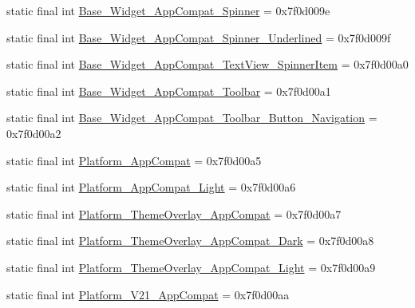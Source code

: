 \begin{DoxyCompactItemize}
\item 
static final int \mbox{\hyperlink{classandroid_1_1support_1_1v7_1_1appcompat_1_1_r_1_1style_a7aebba64b6a5890c12ec4fd4196b36cc}{Base\+\_\+\+Widget\+\_\+\+App\+Compat\+\_\+\+Spinner}} = 0x7f0d009e
\item 
static final int \mbox{\hyperlink{classandroid_1_1support_1_1v7_1_1appcompat_1_1_r_1_1style_a320d36af9a1b161f8d8bceb2add804af}{Base\+\_\+\+Widget\+\_\+\+App\+Compat\+\_\+\+Spinner\+\_\+\+Underlined}} = 0x7f0d009f
\item 
static final int \mbox{\hyperlink{classandroid_1_1support_1_1v7_1_1appcompat_1_1_r_1_1style_a2b2ea8aed9a7cfd0340087f3b14f273f}{Base\+\_\+\+Widget\+\_\+\+App\+Compat\+\_\+\+Text\+View\+\_\+\+Spinner\+Item}} = 0x7f0d00a0
\item 
static final int \mbox{\hyperlink{classandroid_1_1support_1_1v7_1_1appcompat_1_1_r_1_1style_ab2a5b30c6563b433f6b30f720c9febdb}{Base\+\_\+\+Widget\+\_\+\+App\+Compat\+\_\+\+Toolbar}} = 0x7f0d00a1
\item 
static final int \mbox{\hyperlink{classandroid_1_1support_1_1v7_1_1appcompat_1_1_r_1_1style_ad89e1f45e5f45327367aaeb165887dda}{Base\+\_\+\+Widget\+\_\+\+App\+Compat\+\_\+\+Toolbar\+\_\+\+Button\+\_\+\+Navigation}} = 0x7f0d00a2
\item 
static final int \mbox{\hyperlink{classandroid_1_1support_1_1v7_1_1appcompat_1_1_r_1_1style_a384c9f78df3b7c85d4456ea70e0f1a6b}{Platform\+\_\+\+App\+Compat}} = 0x7f0d00a5
\item 
static final int \mbox{\hyperlink{classandroid_1_1support_1_1v7_1_1appcompat_1_1_r_1_1style_aec8d69dfc75b377e70dab4450522249f}{Platform\+\_\+\+App\+Compat\+\_\+\+Light}} = 0x7f0d00a6
\item 
static final int \mbox{\hyperlink{classandroid_1_1support_1_1v7_1_1appcompat_1_1_r_1_1style_ad1eaa7488679a38de1c1d644df0440b0}{Platform\+\_\+\+Theme\+Overlay\+\_\+\+App\+Compat}} = 0x7f0d00a7
\item 
static final int \mbox{\hyperlink{classandroid_1_1support_1_1v7_1_1appcompat_1_1_r_1_1style_ad5eb2d3e6c0cba3c609b9381e2ac06bd}{Platform\+\_\+\+Theme\+Overlay\+\_\+\+App\+Compat\+\_\+\+Dark}} = 0x7f0d00a8
\item 
static final int \mbox{\hyperlink{classandroid_1_1support_1_1v7_1_1appcompat_1_1_r_1_1style_abb38710dc94d78d16e3fa6ccdf5cffd2}{Platform\+\_\+\+Theme\+Overlay\+\_\+\+App\+Compat\+\_\+\+Light}} = 0x7f0d00a9
\item 
static final int \mbox{\hyperlink{classandroid_1_1support_1_1v7_1_1appcompat_1_1_r_1_1style_afa7b7e0d0bda02929a648dc25449126e}{Platform\+\_\+\+V21\+\_\+\+App\+Compat}} = 0x7f0d00aa

\end{DoxyCompactItemize}
